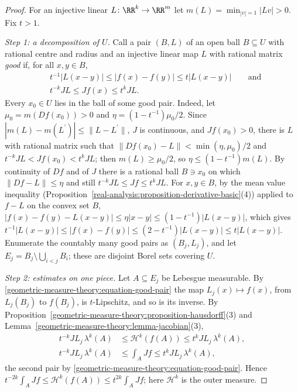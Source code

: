 \begin{proof}
For an injective linear $L \colon \RR^k \to \RR^m$ let $m(L) = \min_{|v| = 1}|Lv| > 0$. Fix $t > 1$.

\emph{Step 1: a decomposition of $U$.} Call a pair $(B, L)$ of an open ball $B \subseteq U$ with rational centre and radius and an injective linear map $L$ with rational matrix \emph{good} if, for all
$x, y \in B$,
\begin{equation}\label{geometric-measure-theory:equation-good-pair}
\begin{aligned}
&t^{-1}|L(x - y)| \leq |f(x) - f(y)| \leq t|L(x - y)| \qquad\text{and}\\
&t^{-k}JL \leq Jf(x) \leq t^kJL .
\end{aligned}
\end{equation}
Every $x_0 \in U$ lies in the ball of some good pair. Indeed, let $\mu_0 = m(Df(x_0)) > 0$ and $\eta = (1 - t^{-1})\mu_0/2$. Since $|m(L) - m(L^{\prime})| \leq \|L - L^{\prime}\|$, $J$ is
continuous, and $Jf(x_0) > 0$, there is $L$ with rational matrix such that $\|Df(x_0) - L\| < \min(\eta, \mu_0)/2$ and $t^{-k}JL < Jf(x_0) < t^kJL$; then $m(L) \geq \mu_0/2$, so
$\eta \leq (1 - t^{-1})m(L)$. By continuity of $Df$ and of $J$ there is a rational ball $B \ni x_0$ on which $\|Df - L\| \leq \eta$ and still $t^{-k}JL \leq Jf \leq t^kJL$. For $x, y \in B$, by the mean value inequality (Proposition~\ref{real-analysis:proposition-derivative-basic}(4))
applied to $f - L$ on the convex set $B$, $|f(x) - f(y) - L(x - y)| \leq \eta|x - y| \leq (1 - t^{-1})|L(x - y)|$, which gives
$t^{-1}|L(x - y)| \leq |f(x) - f(y)| \leq (2 - t^{-1})|L(x - y)| \leq t|L(x - y)|$. Enumerate the countably many good pairs as $(B_j, L_j)$, and let $E_j = B_j \setminus \bigcup_{i < j}B_i$; these are
disjoint Borel sets covering $U$.

\emph{Step 2: estimates on one piece.} Let $A \subseteq E_j$ be Lebesgue measurable. By \eqref{geometric-measure-theory:equation-good-pair} the map $L_j(x) \mapsto f(x)$, from $L_j(B_j)$ to $f(B_j)$, is
$t$-Lipschitz, and so is its inverse. By Proposition~\ref{geometric-measure-theory:proposition-hausdorff}(3) and Lemma~\ref{geometric-measure-theory:lemma-jacobian}(3),
\[\begin{aligned}
t^{-k}JL_j\,\lambda^k(A) &\leq \mathcal{H}^k(f(A)) \leq t^kJL_j\,\lambda^k(A), \\
t^{-k}JL_j\,\lambda^k(A) &\leq \int_AJf \leq t^kJL_j\,\lambda^k(A),
\end{aligned}\]
the second pair by \eqref{geometric-measure-theory:equation-good-pair}. Hence $t^{-2k}\int_AJf \leq \mathcal{H}^k(f(A)) \leq t^{2k}\int_AJf$; here $\mathcal{H}^k$ is the outer measure.


\end{proof}

